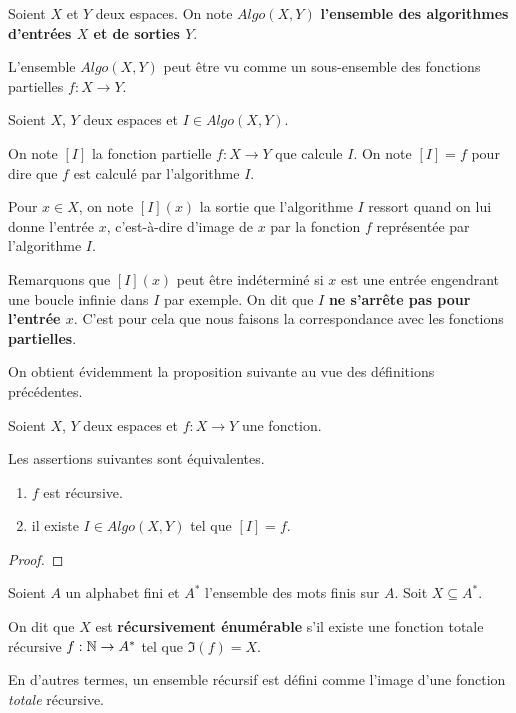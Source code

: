 \begin{definition}
	Soient $X$ et $Y$ deux espaces. On note $Algo(X, Y)$ \textbf{l'ensemble des
	algorithmes d'entrées $X$ et de sorties $Y$}.

	L'ensemble $Algo(X, Y)$ peut être vu comme un sous-ensemble des fonctions
	partielles $f : X \rightarrow Y$.
\end{definition}

\begin{definition}
	Soient $X$, $Y$ deux espaces et $I \in Algo(X, Y)$.

	On note $[I]$ la fonction partielle $f : X \rightarrow Y$ que calcule $I$.
	On note $[I] = f$ pour dire que $f$ est calculé par l'algorithme $I$.

	Pour $x \in X$, on note $[I](x)$ la sortie que l'algorithme $I$ ressort
	quand on lui donne l'entrée $x$, c'est-à-dire d'image de $x$ par la fonction
	$f$ représentée par l'algorithme $I$.

	Remarquons que $[I](x)$ peut être indéterminé si $x$ est une entrée
	engendrant une boucle infinie dans $I$ par exemple. On dit que $I$ \textbf{ne
	s'arrête pas pour l'entrée $x$}. C'est pour cela que nous faisons la
	correspondance avec les fonctions \textbf{partielles}.
\end{definition}

On obtient évidemment la proposition suivante au vue des définitions
précédentes.

\begin{proposition}
	Soient $X$, $Y$ deux espaces et $f : X \rightarrow Y$ une fonction.

	Les assertions suivantes sont équivalentes.
	\begin{enumerate}
		\item $f$ est récursive.
		\item il existe $I \in Algo(X, Y)$ tel que $[I] = f$.
	\end{enumerate}
\end{proposition}

\ifdefined\outputproof
\begin{proof}

\end{proof}
\fi

\begin{definition}
	Soient $A$ un alphabet fini et $A^{*}$ l'ensemble des mots finis sur $A$.
	Soit $X \subseteq A^{*}$.

	On dit que $X$ est \textbf{récursivement énumérable} s'il existe une
	fonction totale récursive $f : \mathbb{N} \rightarrow A^{*}$ tel que $\Im(f) =
	X$.

	En d'autres termes, un ensemble récursif est défini comme l'image d'une
	fonction \textit{totale} récursive.
\end{definition}

